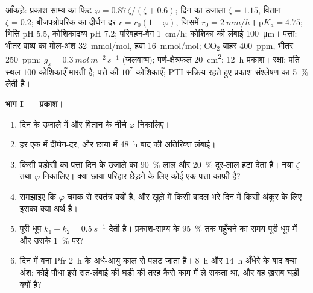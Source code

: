 \begin{problem}
\label{pb:b3:plant-molecular-physiology:1}
आँकड़े: प्रकाश-साम्य का फिट $\varphi = 0.87\,\zeta/(\zeta + 0.6)$; दिन
का उजाला $\zeta = 1.15$, वितान $\zeta = 0.2$; बीजपत्रोपरिक का दीर्घन-दर
$r = r_{0}(1 - \varphi)$, जिसमें $r_{0} = \qty{2}{mm/h}$। 
$\mathrm{p}K_{a} = 4.75$; भित्ति pH $5.5$, कोशिकाद्रव्य pH $7.2$;
परिवहन-वेग \qty{1}{cm/h}; कोशिका की लंबाई \qty{100}{\micro m}। पत्ता:
भीतर वाष्प का मोल-अंश \qty{32}{mmol/mol}, हवा \qty{16}{mmol/mol};
CO$_{2}$ बाहर \qty{400}{ppm}, भीतर \qty{250}{ppm}; $g_{s} =
\qty{0.3}{mol\,m^{-2}\,s^{-1}}$ (जलवाष्प); पर्ण-क्षेत्रफल
\qty{20}{cm^2}; \qty{12}{h} प्रकाश। रक्षा:  प्रति
स्थल $100$ कोशिकाएँ मारती है; पत्ते की $10^{7}$ कोशिकाएँ; PTI सक्रिय
रहते हुए प्रकाश-संश्लेषण का \qty{5}{\%} लेती है।

\medskip
\noindent\textbf{भाग I --- प्रकाश।}
\begin{enumerate}
  \item दिन के उजाले में और वितान के नीचे $\varphi$ निकालिए।
  \item हर एक में दीर्घन-दर, और छाया में \qty{48}{h} बाद की अतिरिक्त
        लंबाई।
  \item किसी पड़ोसी का पत्ता दिन के उजाले का \qty{90}{\%} लाल और
        \qty{20}{\%} दूर-लाल हटा देता है। नया $\zeta$ तथा $\varphi$
        निकालिए। क्या छाया-परिहार छेड़ने के लिए कोई एक पत्ता काफ़ी है?
  \item समझाइए कि $\varphi$ चमक से स्वतंत्र क्यों है, और खुले में किसी
        बादल भरे दिन में किसी अंकुर के लिए इसका क्या अर्थ है।
  \item पूरी धूप $k_{1} + k_{2} = \qty{0.5}{s^{-1}}$ देती है।
        प्रकाश-साम्य के \qty{95}{\%} तक पहुँचने का समय पूरी धूप में और
        उसके \qty{1}{\%} पर?
  \item दिन में बना Pfr \qty{2}{h} के अर्ध-आयु काल से पलट जाता है।
        \qty{8}{h} और \qty{14}{h} अँधेरे के बाद बचा अंश; कोई पौधा इसे
        रात-लंबाई की घड़ी की तरह कैसे काम में ले सकता था, और वह ख़राब
        घड़ी क्यों है?
\end{enumerate}


\end{problem}
